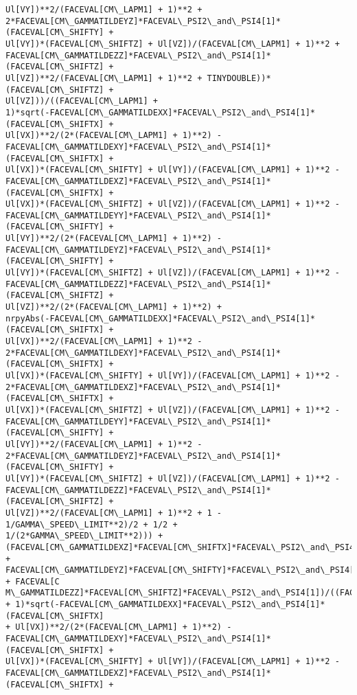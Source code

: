 \documentclass[landscape,letterpaper,10pt,english]{article}
\begin{document}
\begin{Verbatim}[commandchars=\\\{\}]
Ul[VY])**2/(FACEVAL[CM\_LAPM1] + 1)**2 +
2*FACEVAL[CM\_GAMMATILDEYZ]*FACEVAL\_PSI2\_and\_PSI4[1]*(FACEVAL[CM\_SHIFTY] +
Ul[VY])*(FACEVAL[CM\_SHIFTZ] + Ul[VZ])/(FACEVAL[CM\_LAPM1] + 1)**2 +
FACEVAL[CM\_GAMMATILDEZZ]*FACEVAL\_PSI2\_and\_PSI4[1]*(FACEVAL[CM\_SHIFTZ] +
Ul[VZ])**2/(FACEVAL[CM\_LAPM1] + 1)**2 + TINYDOUBLE))*(FACEVAL[CM\_SHIFTZ] +
Ul[VZ]))/((FACEVAL[CM\_LAPM1] +
1)*sqrt(-FACEVAL[CM\_GAMMATILDEXX]*FACEVAL\_PSI2\_and\_PSI4[1]*(FACEVAL[CM\_SHIFTX] +
Ul[VX])**2/(2*(FACEVAL[CM\_LAPM1] + 1)**2) -
FACEVAL[CM\_GAMMATILDEXY]*FACEVAL\_PSI2\_and\_PSI4[1]*(FACEVAL[CM\_SHIFTX] +
Ul[VX])*(FACEVAL[CM\_SHIFTY] + Ul[VY])/(FACEVAL[CM\_LAPM1] + 1)**2 -
FACEVAL[CM\_GAMMATILDEXZ]*FACEVAL\_PSI2\_and\_PSI4[1]*(FACEVAL[CM\_SHIFTX] +
Ul[VX])*(FACEVAL[CM\_SHIFTZ] + Ul[VZ])/(FACEVAL[CM\_LAPM1] + 1)**2 -
FACEVAL[CM\_GAMMATILDEYY]*FACEVAL\_PSI2\_and\_PSI4[1]*(FACEVAL[CM\_SHIFTY] +
Ul[VY])**2/(2*(FACEVAL[CM\_LAPM1] + 1)**2) -
FACEVAL[CM\_GAMMATILDEYZ]*FACEVAL\_PSI2\_and\_PSI4[1]*(FACEVAL[CM\_SHIFTY] +
Ul[VY])*(FACEVAL[CM\_SHIFTZ] + Ul[VZ])/(FACEVAL[CM\_LAPM1] + 1)**2 -
FACEVAL[CM\_GAMMATILDEZZ]*FACEVAL\_PSI2\_and\_PSI4[1]*(FACEVAL[CM\_SHIFTZ] +
Ul[VZ])**2/(2*(FACEVAL[CM\_LAPM1] + 1)**2) +
nrpyAbs(-FACEVAL[CM\_GAMMATILDEXX]*FACEVAL\_PSI2\_and\_PSI4[1]*(FACEVAL[CM\_SHIFTX] +
Ul[VX])**2/(FACEVAL[CM\_LAPM1] + 1)**2 -
2*FACEVAL[CM\_GAMMATILDEXY]*FACEVAL\_PSI2\_and\_PSI4[1]*(FACEVAL[CM\_SHIFTX] +
Ul[VX])*(FACEVAL[CM\_SHIFTY] + Ul[VY])/(FACEVAL[CM\_LAPM1] + 1)**2 -
2*FACEVAL[CM\_GAMMATILDEXZ]*FACEVAL\_PSI2\_and\_PSI4[1]*(FACEVAL[CM\_SHIFTX] +
Ul[VX])*(FACEVAL[CM\_SHIFTZ] + Ul[VZ])/(FACEVAL[CM\_LAPM1] + 1)**2 -
FACEVAL[CM\_GAMMATILDEYY]*FACEVAL\_PSI2\_and\_PSI4[1]*(FACEVAL[CM\_SHIFTY] +
Ul[VY])**2/(FACEVAL[CM\_LAPM1] + 1)**2 -
2*FACEVAL[CM\_GAMMATILDEYZ]*FACEVAL\_PSI2\_and\_PSI4[1]*(FACEVAL[CM\_SHIFTY] +
Ul[VY])*(FACEVAL[CM\_SHIFTZ] + Ul[VZ])/(FACEVAL[CM\_LAPM1] + 1)**2 -
FACEVAL[CM\_GAMMATILDEZZ]*FACEVAL\_PSI2\_and\_PSI4[1]*(FACEVAL[CM\_SHIFTZ] +
Ul[VZ])**2/(FACEVAL[CM\_LAPM1] + 1)**2 + 1 - 1/GAMMA\_SPEED\_LIMIT**2)/2 + 1/2 +
1/(2*GAMMA\_SPEED\_LIMIT**2))) +
(FACEVAL[CM\_GAMMATILDEXZ]*FACEVAL[CM\_SHIFTX]*FACEVAL\_PSI2\_and\_PSI4[1] +
FACEVAL[CM\_GAMMATILDEYZ]*FACEVAL[CM\_SHIFTY]*FACEVAL\_PSI2\_and\_PSI4[1] + FACEVAL[C
M\_GAMMATILDEZZ]*FACEVAL[CM\_SHIFTZ]*FACEVAL\_PSI2\_and\_PSI4[1])/((FACEVAL[CM\_LAPM1]
+ 1)*sqrt(-FACEVAL[CM\_GAMMATILDEXX]*FACEVAL\_PSI2\_and\_PSI4[1]*(FACEVAL[CM\_SHIFTX]
+ Ul[VX])**2/(2*(FACEVAL[CM\_LAPM1] + 1)**2) -
FACEVAL[CM\_GAMMATILDEXY]*FACEVAL\_PSI2\_and\_PSI4[1]*(FACEVAL[CM\_SHIFTX] +
Ul[VX])*(FACEVAL[CM\_SHIFTY] + Ul[VY])/(FACEVAL[CM\_LAPM1] + 1)**2 -
FACEVAL[CM\_GAMMATILDEXZ]*FACEVAL\_PSI2\_and\_PSI4[1]*(FACEVAL[CM\_SHIFTX] +

\end{Verbatim}
\end{document}
